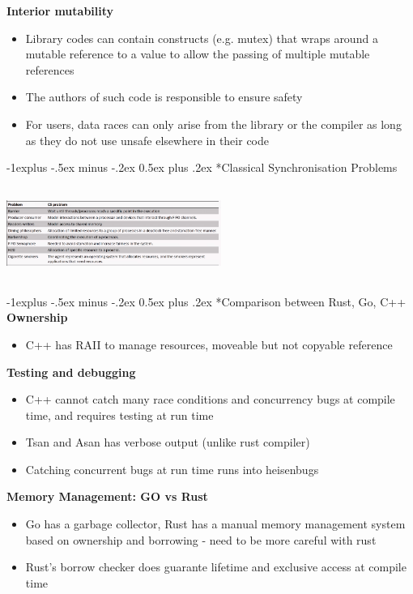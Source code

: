 \documentclass[10pt, landscape]{article}
\makeatletter
\renewcommand{\subsection}{\@startsection{subsection}{2}{0mm}%
                                {-1explus -.5ex minus -.2ex}%
                                {0.5ex plus .2ex}%
                                {\normalfont\normalsize\bfseries}}
\makeatother
\begin{document}
\begin{multicols}{4}
\textbf{Interior mutability} \\ 
\begin{itemize}
    \item Library codes can contain constructs (e.g. mutex) that wraps around a mutable reference to a value to allow the passing of multiple mutable references 
    \item The authors of such code is responsible to ensure safety 
    \item For users, data races can only arise from the library or the compiler as long as they do not use unsafe elsewhere in their code
\end{itemize}

\pagebreak
\subsection*{Classical Synchronisation Problems}

\includegraphics*[width=7cm, height=3cm]{classicalSummary.png}

\subsection*{Comparison between Rust, Go, C++}
\textbf{Ownership} \\ 
\begin{itemize}
    \item C++ has RAII to manage resources, moveable but not copyable reference
\end{itemize}

\textbf{Testing and debugging} \\
\begin{itemize}
    \item C++ cannot catch many race conditions and concurrency bugs at compile time, and requires testing at run time 
    \item Tsan and Asan has verbose output (unlike rust compiler)
    \item Catching concurrent bugs at run time runs into heisenbugs
\end{itemize}

\textbf{Memory Management: GO vs Rust} \\
\begin{itemize}
    \item Go has a garbage collector, Rust has a manual memory management system based on ownership and borrowing - need to be more careful with rust 
    \item Rust's borrow checker does guarante lifetime and exclusive access at compile time
\end{itemize}


\end{multicols}
\end{document}
